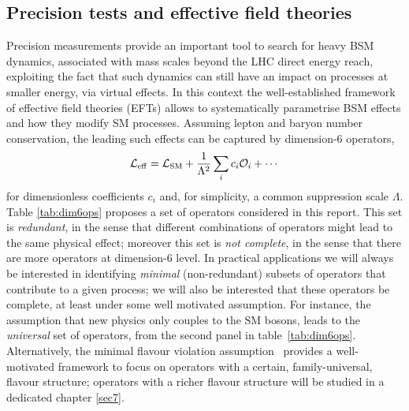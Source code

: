 \subsection{Precision tests and effective field theories}\label{sec:eftintro}
Precision measurements provide an important tool to search for heavy BSM dynamics, associated with mass scales beyond the LHC direct energy reach,  exploiting the fact that such dynamics can still have an impact on processes at smaller energy, via virtual effects.
%
In this context the well-established framework of effective field theories (EFTs) allows to systematically parametrise BSM effects and how they modify SM processes. Assuming lepton and baryon number conservation, the leading such effects can be captured by dimension-6 operators,
\begin{equation}\label{EFTLAG}
\mathcal{L}_{\rm eff} = \mathcal{L}_{\rm SM} + \frac{1}{\Lambda^2} \sum_{i} c_i \mathcal{O}_i+\cdots
\end{equation}
for dimensionless coefficients $c_i$ and, for simplicity, a common suppression scale $\Lambda$. Table \ref{tab:dim6ops} proposes a  set of operators considered in this report. This set is \emph{redundant}, in the sense that different combinations of operators might lead to the same physical effect; moreover this set is \emph{not complete}, in the sense that there are more  operators at dimension-6 level.
In practical applications we will always be interested in identifying \emph{minimal} (non-redundant) subsets of operators that contribute to a given process; we will also be interested that these operators be complete, at least under some well motivated assumption. For instance, the assumption that new physics only couples to the SM bosons, leads to the \emph{universal} set of operators, from the second panel in table~\ref{tab:dim6ops}. Alternatively, the minimal flavour violation assumption~\cite{DAmbrosio:2002vsn} provides a well-motivated framework to focus on operators with a certain, family-universal, flavour structure; operators with a richer flavour structure will be studied in a dedicated chapter \ref{sec7}.



